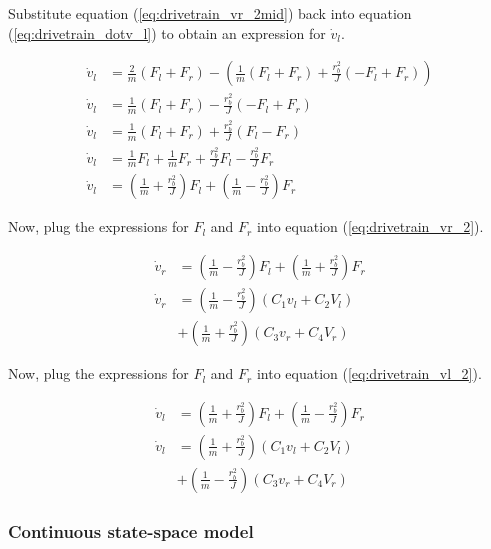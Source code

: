 Substitute equation (\ref{eq:drivetrain_vr_2mid}) back into equation
(\ref{eq:drivetrain_dotv_l}) to obtain an expression for $\dot{v}_l$.

\begin{align}
  \dot{v}_l &= \frac{2}{m} (F_l + F_r) - \left(\frac{1}{m} (F_l + F_r) +
    \frac{r_b^2}{J} (-F_l + F_r)\right) \nonumber \\
  \dot{v}_l &= \frac{1}{m} (F_l + F_r) - \frac{r_b^2}{J} (-F_l + F_r)
    \nonumber \\
  \dot{v}_l &= \frac{1}{m} (F_l + F_r) + \frac{r_b^2}{J} (F_l - F_r) \nonumber
    \\
  \dot{v}_l &= \frac{1}{m} F_l + \frac{1}{m} F_r + \frac{r_b^2}{J} F_l -
    \frac{r_b^2}{J} F_r \nonumber \\
  \dot{v}_l &= \left(\frac{1}{m} + \frac{r_b^2}{J}\right) F_l +
    \left(\frac{1}{m} - \frac{r_b^2}{J}\right) F_r \label{eq:drivetrain_vl_2}
\end{align}

Now, plug the expressions for $F_l$ and $F_r$ into equation
(\ref{eq:drivetrain_vr_2}).

\begin{align}
  \dot{v}_r &= \left(\frac{1}{m} - \frac{r_b^2}{J}\right) F_l +
    \left(\frac{1}{m} + \frac{r_b^2}{J}\right) F_r \nonumber \\
  \dot{v}_r &= \left(\frac{1}{m} - \frac{r_b^2}{J}\right)
    \left(C_1 v_l + C_2 V_l\right) \nonumber \\
  & + \left(\frac{1}{m} + \frac{r_b^2}{J}\right) \left(C_3 v_r + C_4 V_r\right)
    \label{eq:drivetrain_model_left}
\end{align}

Now, plug the expressions for $F_l$ and $F_r$ into equation
(\ref{eq:drivetrain_vl_2}).

\begin{align}
  \dot{v}_l &= \left(\frac{1}{m} + \frac{r_b^2}{J}\right) F_l +
    \left(\frac{1}{m} - \frac{r_b^2}{J}\right) F_r \nonumber \\
  \dot{v}_l &= \left(\frac{1}{m} + \frac{r_b^2}{J}\right)
    \left(C_1 v_l + C_2 V_l\right) \nonumber \\
  & + \left(\frac{1}{m} - \frac{r_b^2}{J}\right) \left(C_3 v_r + C_4 V_r\right)
    \label{eq:drivetrain_model_right}
\end{align}

\subsubsection{Continuous state-space model}

